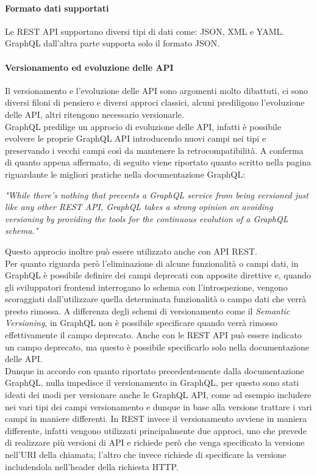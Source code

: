 \paragraph{Formato dati supportati}
Le REST API supportano diversi tipi di dati come: JSON, XML e YAML. GraphQL dall'altra parte supporta solo il formato JSON.
\paragraph{Versionamento ed evoluzione delle API}
Il versionamento e l'evoluzione delle API sono argomenti molto dibattuti, ci sono diversi filoni di pensiero e diversi approci classici, alcuni prediligono l'evoluzione delle API, altri ritengono necessario versionarle.\\
GraphQL predilige un approcio di evoluzione delle API, infatti è possibile evolvere le proprie GraphQL API introducendo nuovi campi nei tipi e preservando i vecchi campi così da mantenere la retrocompatibilità. A conferma di quanto appena affermato, di seguito viene riportato quanto scritto nella pagina riguardante le migliori pratiche nella documentazione GraphQL:
\begin{quoting}
  \textit{"While there’s nothing that prevents a GraphQL service from being versioned just like any other REST API, GraphQL takes a strong opinion on avoiding versioning by providing the tools for the continuous evolution of a GraphQL schema."}
\end{quoting}
Questo approcio inoltre può essere utilizzato anche con API REST.\\
Per quanto riguarda però l'eliminazione di alcune funzionalità o campi dati, in GraphQL è possibile definire dei campi deprecati con apposite direttive e, quando gli sviluppatori frontend interrogano lo schema con l'introspezione, vengono scoraggiati dall'utilizzare quella determinata funzionalità o campo dati che verrà presto rimossa. A differenza degli schemi di versionamento come il \textit{Semantic Versioning}, in GraphQL non è possibile specificare quando verrà rimosso effettivamente il campo deprecato. Anche con le REST API può essere indicato un campo deprecato, ma questo è possibile specificarlo solo nella documentazione delle API.\\
Dunque in accordo con quanto riportato precedentemente dalla documentazione GraphQL, nulla impedisce il versionamento in GraphQL, per questo sono stati ideati dei modi per versionare anche le GraphQL API, come ad esempio includere nei vari tipi dei campi versionamento e dunque in base alla versione trattare i vari campi in maniere differenti. In REST invece il versionamento avviene in maniera differente, infatti vengono utilizzati principalmente due approci, uno che prevede di realizzare più versioni di API e richiede però che venga specificato la versione nell'URI della chiamata; l'altro che invece richiede di specificare la versione includendola nell'header della richiesta HTTP.
